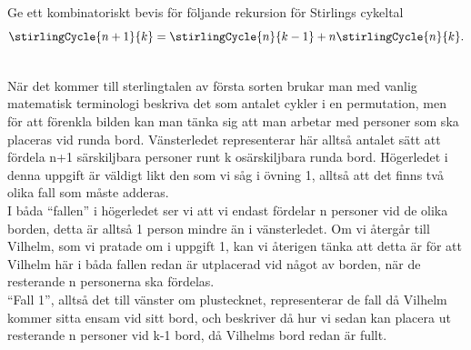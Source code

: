 \documentclass[nobib]{tufte-handout}
\begin{document}
\newpage
\begin{xca2}
  Ge ett kombinatoriskt bevis för följande rekursion för Stirlings cykeltal
  $$\stirlingCycle{n+1}{k} = \stirlingCycle{n}{k-1} + n\stirlingCycle{n}{k}.$$
  
  \\ \bigskip
När det kommer till sterlingtalen av första sorten brukar man med vanlig matematisk terminologi beskriva det som antalet cykler i en permutation, men för att förenkla bilden kan man tänka sig att man arbetar med personer som ska placeras vid runda bord. Vänsterledet representerar här alltså antalet sätt att fördela n+1 särskiljbara personer runt k osärskiljbara runda bord. Högerledet i denna uppgift är väldigt likt den som vi såg i övning 1, alltså att det finns två olika fall som måste adderas.\\
I båda “fallen” i högerledet ser vi att vi endast fördelar n personer vid de olika borden, detta är alltså 1 person mindre än i vänsterledet. Om vi återgår till Vilhelm, som vi pratade om i uppgift 1,  kan vi återigen tänka att detta är för att Vilhelm här i båda fallen redan är utplacerad vid något av borden, när de resterande n personerna ska fördelas. \\
“Fall 1”, alltså det till vänster om plustecknet, representerar de fall då Vilhelm kommer sitta ensam vid sitt bord, och beskriver då hur vi sedan kan placera ut resterande n personer vid k-1 bord, då Vilhelms bord redan är fullt. 


\end{xca2}
\end{document}
